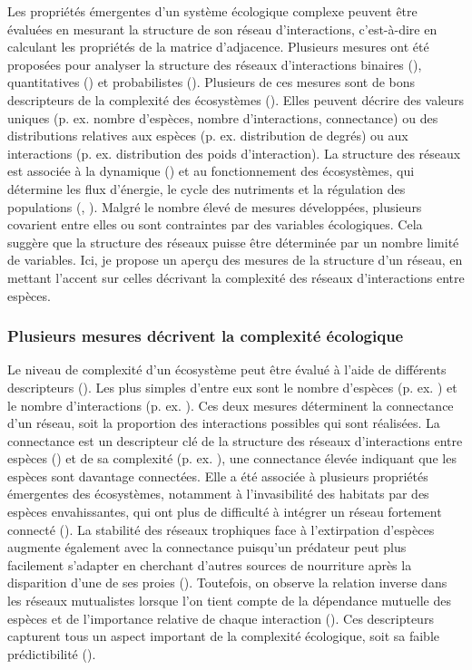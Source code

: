 Les propriétés émergentes d'un système écologique complexe peuvent être évaluées
en mesurant la structure de son réseau d'interactions, c'est-à-dire en calculant
les propriétés de la matrice d'adjacence. Plusieurs mesures ont été proposées
pour analyser la structure des réseaux d'interactions binaires
(\cite{Delmas2019Analysing}), quantitatives (\cite{Bersier2002Quantitative}) et
probabilistes (\cite{Poisot2016Structure}). Plusieurs de ces mesures sont de
bons descripteurs de la complexité des écosystèmes (\cite{Landi2018Complexity}).
Elles peuvent décrire des valeurs uniques (p. ex. nombre d'espèces, nombre
d'interactions, connectance) ou des distributions relatives aux espèces (p. ex.
distribution de degrés) ou aux interactions (p. ex. distribution des poids
d'interaction). La structure des réseaux est associée à la dynamique
(\cite{Pascual2006Ecological}) et au fonctionnement des écosystèmes, qui
détermine les flux d'énergie, le cycle des nutriments et la régulation des
populations (\cite{McCann2011Food}, \cite{Thompson2012Food}). Malgré le nombre
élevé de mesures développées, plusieurs covarient entre elles ou sont
contraintes par des variables écologiques. Cela suggère que la structure des
réseaux puisse être déterminée par un nombre limité de variables. Ici, je
propose un aperçu des mesures de la structure d'un réseau, en mettant l'accent
sur celles décrivant la complexité des réseaux d'interactions entre espèces. 

\subsubsection{Plusieurs mesures décrivent la complexité écologique} 

Le niveau de complexité d'un écosystème peut être évalué à l'aide de différents
descripteurs (\cite{Landi2018Complexity}). Les plus simples d'entre eux sont le
nombre d'espèces (p. ex. \cite{May1972Will}) et le nombre d'interactions (p. ex.
\cite{Okuyama2008Network}). Ces deux mesures déterminent la connectance d'un
réseau, soit la proportion des interactions possibles qui sont réalisées. La
connectance est un descripteur clé de la structure des réseaux d'interactions
entre espèces (\cite{Martinez1992Constant}) et de sa complexité (p. ex.
\cite{Rozdilsky2001Complexity}), une connectance élevée indiquant que les
espèces sont davantage connectées. Elle a été associée à plusieurs propriétés
émergentes des écosystèmes, notamment à l'invasibilité des habitats par des
espèces envahissantes, qui ont plus de difficulté à intégrer un réseau fortement
connecté (\cite{Smith-Ramesh2017Global}). La stabilité des réseaux trophiques
face à l'extirpation d'espèces augmente également avec la connectance puisqu'un
prédateur peut plus facilement s'adapter en cherchant d'autres sources de
nourriture après la disparition d'une de ses proies (\cite{Dunne2002Network}).
Toutefois, on observe la relation inverse dans les réseaux mutualistes lorsque
l'on tient compte de la dépendance mutuelle des espèces et de l'importance
relative de chaque interaction (\cite{Vieira2015Simple}). Ces descripteurs
capturent tous un aspect important de la complexité écologique, soit sa faible
prédictibilité (\cite{Strydom2021Svd}). 

